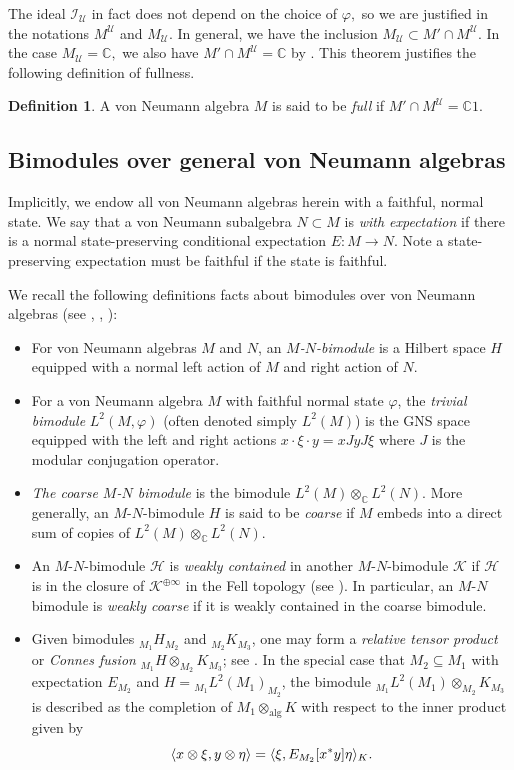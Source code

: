 \documentclass[10pt]{amsart}
\numberwithin{equation}{section}
\theoremstyle{definition}
\newtheorem{defn}[thm]{Definition}
\newcommand{\C}{\mathbb{C}}
\newcommand{\cH}{\mathcal{H}}
\newcommand{\cI}{\mathcal{I}}
\newcommand{\cK}{\mathcal{K}}
\newcommand{\cU}{\mathcal{U}}
\DeclarePairedDelimiter{\ip}{\langle}{\rangle}
\begin{document}
The ideal $\cI_\cU$ in fact does not depend on the choice of $\varphi,$ so we are justified in the notations $M^\cU$ and $M_\cU$. In general, we have the inclusion $M_\cU \subset M'\cap M^\cU$. In the case $M_\cU = \C,$ we also have $M'\cap M^\cU = \C$ by \cite[Theorem~5.2]{AndoHaag2014typeIIIultra}. This theorem justifies the following definition of fullness.

\begin{defn}
A von Neumann algebra $M$ is said to be \emph{full} if $M'\cap M^\cU = \C1$.
\end{defn}



\subsection{Bimodules over general von Neumann algebras}

Implicitly, we endow all von Neumann algebras herein with a faithful, normal state. We say that a von Neumann subalgebra $N\subset M$ is \emph{with expectation} if there is a normal state-preserving conditional expectation $E: M\to N$.  Note a state-preserving expectation must be faithful if the state is faithful. 

We recall the following definitions facts about bimodules over von Neumann algebras (see \cite[Appendix F]{BrownOzawa2008}, \cite{OOTHaag}, \cite{BMOCoAmenable}):
\begin{itemize}
    \item For von Neumann algebras $M$ and $N$, an \emph{$M$-$N$-bimodule} is a Hilbert space $H$ equipped with a normal left action of $M$ and right action of $N$.
    \item For a von Neumann algebra $M$ with faithful normal state $\varphi$, the \emph{trivial bimodule} $L^2(M,\varphi)$ (often denoted simply $L^2(M)$) is the GNS space equipped with the left and right actions $x \cdot \xi \cdot y = x JyJ \xi$ where $J$ is the modular conjugation operator.
    \item \emph{The coarse $M$-$N$ bimodule} is the bimodule $L^2(M) \otimes_{\C} L^2(N)$.  More generally, an $M$-$N$-bimodule $H$ is said to be \emph{coarse} if $M$ embeds into a direct sum of copies of $L^2(M) \otimes_{\C} L^2(N)$.
    \item An $M$-$N$-bimodule $\cH$ is \emph{weakly contained} in another $M$-$N$-bimodule $\cK$ if $\cH$ is in the closure of $\cK^{\oplus\infty}$ in the Fell topology (see \cite[Section~13.3.2]{anantharaman-popa}).  In particular, an $M$-$N$ bimodule is \emph{weakly coarse} if it is weakly contained in the coarse bimodule.
    \item Given bimodules $_{M_1} H_{M_2}$ and $_{M_2} K_{M_3}$, one may form a \emph{relative tensor product} or \emph{Connes fusion} $_{M_1} H \otimes_{M_2} K_{M_3}$; see \cite{OOTHaag}.  In the special case that $M_2 \subseteq M_1$ with expectation $E_{M_2}$ and $H = {}_{M_1} L^2(M_1)_{M_2}$, the bimodule ${}_{M_1} L^2(M_1) \otimes_{M_2} K_{M_3}$ is described as the completion of $M_1 \otimes_{\operatorname{alg}} K$ with respect to the inner product given by
    \[
    \ip{x \otimes \xi, y \otimes \eta} = \ip{\xi, E_{M_2}[x^*y] \eta}_K.
    \]
\end{itemize}
\end{document}
